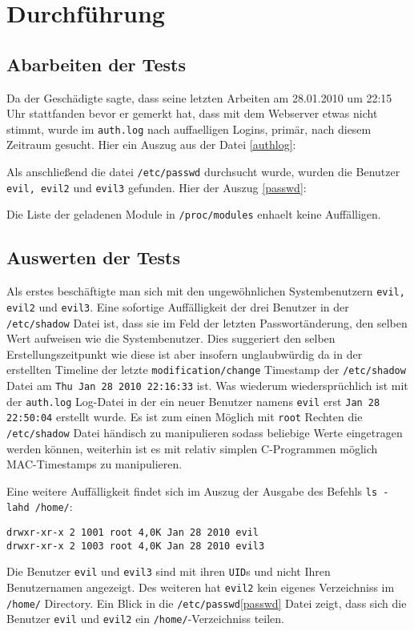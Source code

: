 \section{Durchführung}
\subsection{Abarbeiten der Tests}
Da der Geschädigte sagte, dass seine letzten Arbeiten am 28.01.2010 um 22:15 Uhr stattfanden bevor er gemerkt hat, dass mit dem Webserver etwas nicht stimmt, wurde im \texttt{auth.log} nach auffaelligen Logins, primär, nach diesem Zeitraum gesucht.
Hier ein Auszug aus der Datei \ref{authlog}:
\lstset{basicstyle=\footnotesize, breaklines=true, breakatwhitespace=true}


Als anschließend die datei \texttt{/etc/passwd} durchsucht wurde, wurden die Benutzer \texttt{evil, evil2} und \texttt{evil3} gefunden. Hier der Auszug \ref{passwd}:
\lstset{basicstyle=\footnotesize, breaklines=true, breakatwhitespace=true}



Die Liste der geladenen Module in \texttt{/proc/modules} enhaelt keine Auffälligen.
\pagebreak
\subsection{Auswerten der Tests}
Als erstes beschäftigte man sich mit den ungewöhnlichen Systembenutzern \texttt{evil, evil2} und \texttt{evil3}. Eine sofortige Auffälligkeit der drei Benutzer in der \texttt{/etc/shadow} Datei ist, dass sie im Feld der letzten Passwortänderung, den selben Wert aufweisen wie die Systembenutzer. Dies suggeriert den selben Erstellungszeitpunkt wie diese ist aber insofern unglaubwürdig da in der erstellten Timeline der letzte \texttt{modification/change} Timestamp der \texttt{/etc/shadow} Datei am \texttt{Thu Jan 28 2010 22:16:33} ist. Was wiederum wiedersprüchlich ist mit der \texttt{auth.log} Log-Datei in der ein neuer Benutzer namens \texttt{evil} erst \texttt{Jan 28 22:50:04} erstellt wurde. Es ist zum einen Möglich mit \texttt{root} Rechten die \texttt{/etc/shadow} Datei händisch zu manipulieren sodass beliebige Werte eingetragen werden können, weiterhin ist es mit relativ simplen C-Programmen möglich MAC-Timestamps zu manipulieren.

Eine weitere Auffälligkeit findet sich im Auszug der Ausgabe des Befehls \texttt{ls -lahd /home/}:
\begin{verbatim}
drwxr-xr-x 2 1001 root 4,0K Jan 28 2010 evil
drwxr-xr-x 2 1003 root 4,0K Jan 28 2010 evil3
\end{verbatim}
Die Benutzer \texttt{evil} und \texttt{evil3} sind mit ihren \texttt{UID}s und nicht Ihren Benutzernamen angezeigt. Des weiteren hat \texttt{evil2} kein eigenes Verzeichniss im \texttt{/home/} Directory. Ein Blick in die \texttt{/etc/passwd}\ref{passwd} Datei zeigt, dass sich die Benutzer \texttt{evil} und \texttt{evil2} ein \texttt{/home/}-Verzeichniss teilen.
\lstset{basicstyle=\footnotesize, breaklines=true, breakatwhitespace=true}


